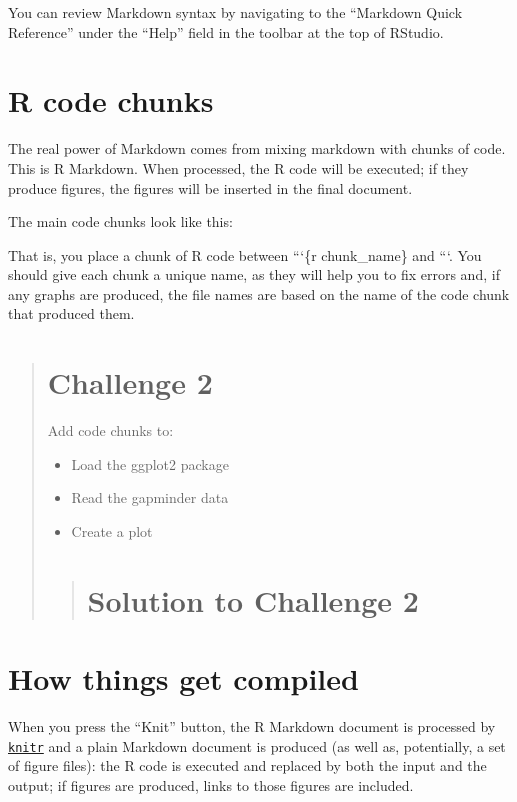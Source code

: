 \documentclass[]{book}
\providecommand{\tightlist}{%
  \setlength{\itemsep}{0pt}\setlength{\parskip}{0pt}}
\begin{document}
You can review Markdown syntax by navigating to the ``Markdown Quick
Reference'' under the ``Help'' field in the toolbar at the top of
RStudio.

\section{R code chunks}\label{r-code-chunks}

The real power of Markdown comes from mixing markdown with chunks of
code. This is R Markdown. When processed, the R code will be executed;
if they produce figures, the figures will be inserted in the final
document.

The main code chunks look like this:

That is, you place a chunk of R code between ```\{r chunk\_name\} and
```. You should give each chunk a unique name, as they will help you to
fix errors and, if any graphs are produced, the file names are based on
the name of the code chunk that produced them.

\begin{quote}
\section{Challenge 2}\label{challenge-2-1}

Add code chunks to:

\begin{itemize}
\tightlist
\item
  Load the ggplot2 package
\item
  Read the gapminder data
\item
  Create a plot
\end{itemize}

\begin{quote}
\section{Solution to Challenge 2}\label{solution-to-challenge-2-1}
\end{quote}
\end{quote}

\section{How things get compiled}\label{how-things-get-compiled}

When you press the ``Knit'' button, the R Markdown document is processed
by \href{http://yihui.name/knitr}{\texttt{knitr}} and a plain Markdown
document is produced (as well as, potentially, a set of figure files):
the R code is executed and replaced by both the input and the output; if
figures are produced, links to those figures are included.
\end{document}
